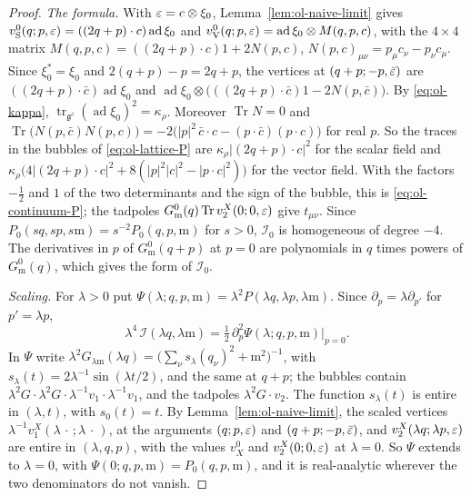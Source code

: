 \begin{proof}
\emph{The formula.} With $\varepsilon=c\otimes \xi_0$, Lemma~\ref{lem:ol-naive-limit} gives $v^0_{\rm S}(q;p,\varepsilon)=((2q+p)\cdot c)\operatorname{ad}\xi_0$ and $v^0_{\rm V}(q;p,\varepsilon)=\operatorname{ad}\xi_0\otimes M(q,p,c)$, with the $4\times4$ matrix $M(q,p,c)=((2q+p)\cdot c)1+2N(p,c)$, $N(p,c)_{\mu\nu}=p_\mu c_\nu-p_\nu c_\mu$. Since $\xi_0^*=\xi_0$ and $2(q+p)-p=2q+p$, the vertices at $(q+p;-p,\bar{\varepsilon})$ are $((2q+p)\cdot\bar c)\operatorname{ad}\xi_0$ and $\operatorname{ad}\xi_0\otimes\big(((2q+p)\cdot\bar c)1-2N(p,\bar c)\big)$. By \eqref{eq:ol-kappa}, $\operatorname{tr}_{\mathfrak g^c}(\operatorname{ad}\xi_0)^2=\kappa_\rho$. Moreover $\operatorname{Tr}N=0$ and $\operatorname{Tr}\big(N(p,\bar c)N(p,c)\big)=-2\big(|p|^2\,\bar c\cdot c-(p\cdot\bar c)(p\cdot c)\big)$ for real $p$. So the traces in the bubbles of \eqref{eq:ol-lattice-P} are $\kappa_\rho|(2q+p)\cdot c|^2$ for the scalar field and $\kappa_\rho\big(4|(2q+p)\cdot c|^2+8(|p|^2|c|^2-|p\cdot c|^2)\big)$ for the vector field. With the factors $-\frac12$ and $1$ of the two determinants and the sign of the bubble, this is \eqref{eq:ol-continuum-P}; the tadpoles $G^0_{\mathrm m}(q)\operatorname{Tr}v_2^X(0;0,\varepsilon)$ give $t_{\mu\nu}$. Since $P_0(sq,sp,s\mathrm m)=s^{-2}P_0(q,p,\mathrm m)$ for $s>0$, $\mathcal I_0$ is homogeneous of degree $-4$. The derivatives in $p$ of $G^0_{\mathrm m}(q+p)$ at $p=0$ are polynomials in $q$ times powers of $G^0_{\mathrm m}(q)$, which gives the form of $\mathcal I_0$.

\emph{Scaling.} For $\lambda>0$ put $\Psi(\lambda;q,p,\mathrm m)=\lambda^2P(\lambda q,\lambda p,\lambda\mathrm m)$. Since $\partial_p=\lambda\partial_{p'}$ for $p'=\lambda p$,
\[
\lambda^4\,\mathcal I(\lambda q,\lambda\mathrm m)=\tfrac12\,\partial_p^2\Psi(\lambda;q,p,\mathrm m)\big|_{p=0}.
\]
In $\Psi$ write $\lambda^2G_{\lambda\mathrm m}(\lambda q)=\big(\sum_\nu s_\lambda(q_\nu)^2+\mathrm m^2\big)^{-1}$, with $s_\lambda(t)=2\lambda^{-1}\sin(\lambda t/2)$, and the same at $q+p$; the bubbles contain $\lambda^2G\cdot\lambda^2G\cdot\lambda^{-1}v_1\cdot\lambda^{-1}v_1$, and the tadpoles $\lambda^2G\cdot v_2$. The function $s_\lambda(t)$ is entire in $(\lambda,t)$, with $s_0(t)=t$. By Lemma~\ref{lem:ol-naive-limit}, the scaled vertices $\lambda^{-1}v_1^X(\lambda\,\cdot\,;\lambda\,\cdot\,)$, at the arguments $(q;p,\varepsilon)$ and $(q+p;-p,\bar{\varepsilon})$, and $v_2^X(\lambda q;\lambda p,\varepsilon)$ are entire in $(\lambda,q,p)$, with the values $v^0_X$ and $v_2^X(0;0,\varepsilon)$ at $\lambda=0$. So $\Psi$ extends to $\lambda=0$, with $\Psi(0;q,p,\mathrm m)=P_0(q,p,\mathrm m)$, and it is real-analytic wherever the two denominators do not vanish.


\end{proof}
